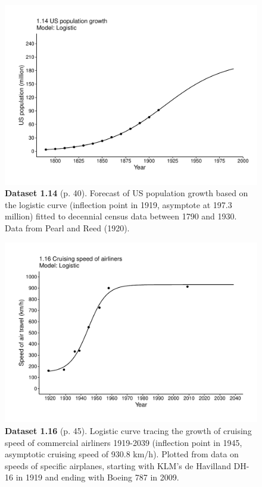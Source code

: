 \documentclass[aps,rmp,preprint,superscriptaddress,10pt,onecolumn]{article}
\begin{document}
\clearpage
\begin{figure}[h]
\includegraphics[width=\textwidth]{output/figs-ggplot/1.14.pdf}
\caption*{\textbf{Dataset 1.14} (p. 40). Forecast of US population growth based on the logistic curve (inflection point in 1919, asymptote at 197.3 million) fitted to decennial census data between 1790 and 1930. Data from Pearl and Reed (1920).}
\end{figure}
	
\clearpage
\begin{figure}[h]
\includegraphics[width=\textwidth]{output/figs-ggplot/1.16.pdf}
\caption*{\textbf{Dataset 1.16} (p. 45). Logistic curve tracing the growth of cruising speed of commercial airliners 1919-2039 (inflection point in 1945, asymptotic cruising speed of 930.8 km/h). Plotted from data on speeds of specific airplanes, starting with KLM's de Havilland DH-16 in 1919 and ending with Boeing 787 in 2009. }
\end{figure}
	
\end{document}
